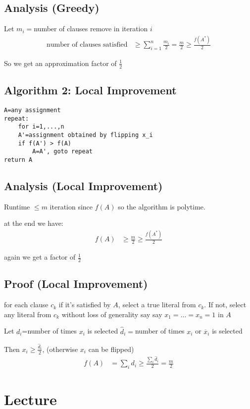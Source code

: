 \documentclass[english,12pt]{article}
\theoremstyle{plain}
\theoremstyle{definition}
\theoremstyle{definition} %
\begin{document}
\subsection{Analysis (Greedy)}
Let $m_i=$number of clauses remove in iteration $i$
\begin{align*}
\text{number of clauses satisfied}&\ge\sum_{i=1}^n\frac{m_i}{2}
=\frac{m}{2}
\ge \frac{f(A^\ast)}{2}
\end{align*}

So we get an approximation factor of $\frac{1}{2}$

\subsection{Algorithm 2: Local Improvement}
\begin{verbatim}
A=any assignment
repeat:
    for i=1,...,n
    A'=assignment obtained by flipping x_i
    if f(A') > f(A)
        A=A', goto repeat
return A
\end{verbatim}

\subsection{Analysis (Local Improvement)}
Runtime $\le m$ iteration since $f(A)$ so the algorithm is polytime.

at the end we have:
\begin{align*}
f(A) &\ge \frac{m}{2}\ge \frac{f(A^\ast)}{2}
\end{align*}

again we get a factor of $\frac{1}{2}$

\subsection{Proof (Local Improvement)}
for each clause $c_k$ if it's satisfied by $A$, select a true literal from $c_k$.  If not, select any literal from $c_k$
without loss of generality say say $x_1=\ldots=x_n=1$ in $A$

Let $d_i$=number of times $x_i$ is selected
$\hat{d}_i=$number of times $x_i$ or $\overline{x}_i$ is selected

Then $x_i\ge\frac{\hat{d}_i}{2}$, (otherwise $x_i$ can be flipped)
\begin{align*}
f(A)&=\sum_i d_i
\ge \frac{\sum_i\hat{d}_i}{2}
=\frac{m}{2}
\end{align*}

\section{Lecture}
\end{document}
